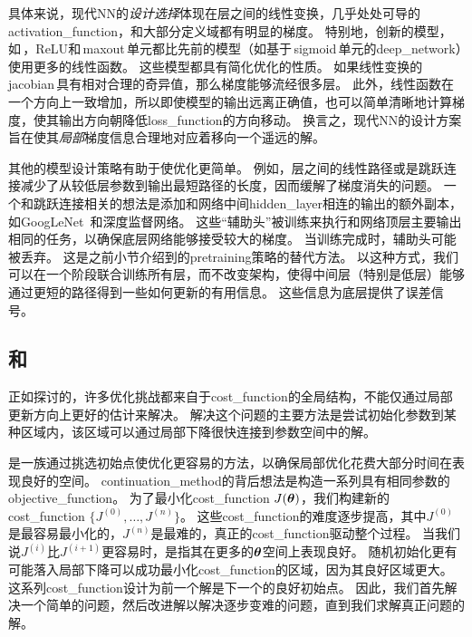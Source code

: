 具体来说，现代\gls{NN}的\emph{设计选择}体现在层之间的线性变换，几乎处处可导的\gls{activation_function}，和大部分定义域都有明显的梯度。
特别地，创新的模型，如\,，\gls{ReLU}和\,\gls{maxout}\,单元都比先前的模型（如基于\,\gls{sigmoid}\,单元的\gls{deep_network}）使用更多的线性函数。
这些模型都具有简化优化的性质。
如果线性变换的\,\gls{jacobian}\,具有相对合理的奇异值，那么梯度能够流经很多层。
此外，线性函数在一个方向上一致增加，所以即使模型的输出远离正确值，也可以简单清晰地计算梯度，使其输出方向朝降低\gls{loss_function}的方向移动。
换言之，现代\gls{NN}的设计方案旨在使其\emph{局部}梯度信息合理地对应着移向一个遥远的解。

其他的模型设计策略有助于使优化更简单。
例如，层之间的线性路径或是跳跃连接减少了从较低层参数到输出最短路径的长度，因而缓解了梯度消失的问题\citep{Srivastava-et-al-arxiv2015}。
一个和跳跃连接相关的想法是添加和网络中间\gls{hidden_layer}相连的输出的额外副本，如GoogLeNet~\citep{Szegedy-et-al-arxiv2014}和深度监督网络\citep{Lee-et-al-2014}。
这些``辅助头''被训练来执行和网络顶层主要输出相同的任务，以确保底层网络能够接受较大的梯度。
当训练完成时，辅助头可能被丢弃。
这是之前小节介绍到的\gls{pretraining}策略的替代方法。
以这种方式，我们可以在一个阶段联合训练所有层，而不改变架构，使得中间层（特别是低层）能够通过更短的路径得到一些如何更新的有用信息。
这些信息为底层提供了误差信号。


\subsection{和}
\label{sec:continuation_methods_and_curriculum_learning}
正如探讨的，许多优化挑战都来自于\gls{cost_function}的全局结构，不能仅通过局部更新方向上更好的估计来解决。
解决这个问题的主要方法是尝试初始化参数到某种区域内，该区域可以通过局部下降很快连接到参数空间中的解。


是一族通过挑选初始点使优化更容易的方法，以确保局部优化花费大部分时间在表现良好的空间。
\gls{continuation_method}的背后想法是构造一系列具有相同参数的\gls{objective_function}。
为了最小化\gls{cost_function} $J(\boldsymbol{\theta})$，我们构建新的\gls{cost_function} $\{J^{(0)},\dots,J^{(n)}\}$。
这些\gls{cost_function}的难度逐步提高，其中$J^{(0)}$是最容易最小化的，$J^{(n)}$是最难的，真正的\gls{cost_function}驱动整个过程。
当我们说$J^{(i)}$比$J^{(i+1)}$更容易时，是指其在更多的$\boldsymbol{\theta}$空间上表现良好。
随机初始化更有可能落入局部下降可以成功最小化\gls{cost_function}的区域，因为其良好区域更大。
这系列\gls{cost_function}设计为前一个解是下一个的良好初始点。
因此，我们首先解决一个简单的问题，然后改进解以解决逐步变难的问题，直到我们求解真正问题的解。

